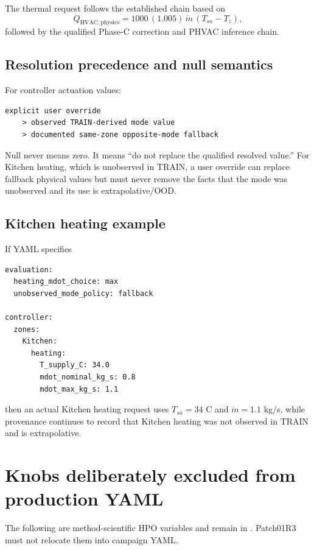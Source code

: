 \documentclass[10pt]{article}
\begin{document}
The thermal request follows the established chain based on
\[
Q_{\mathrm{HVAC,physics}}=1000\,(1.005)\,\dot m\,(T_{sa}-T_z),
\]
followed by the qualified Phase-C correction and PHVAC inference chain.

\subsection{Resolution precedence and null semantics}
For controller actuation values:
\begin{verbatim}
explicit user override
    > observed TRAIN-derived mode value
    > documented same-zone opposite-mode fallback
\end{verbatim}

Null never means zero. It means ``do not replace the qualified resolved value.'' For Kitchen heating, which is unobserved in TRAIN, a user override can replace fallback physical values but must never remove the facts that the mode was unobserved and its use is extrapolative/OOD.

\subsection{Kitchen heating example}
If YAML specifies
\begin{Verbatim}[fontsize=\small]
evaluation:
  heating_mdot_choice: max
  unobserved_mode_policy: fallback

controller:
  zones:
    Kitchen:
      heating:
        T_supply_C: 34.0
        mdot_nominal_kg_s: 0.8
        mdot_max_kg_s: 1.1
\end{Verbatim}
then an actual Kitchen heating request uses $T_{sa}=34$ C and $\dot m=1.1$ kg/s, while provenance continues to record that Kitchen heating was not observed in TRAIN and is extrapolative.

\section{Knobs deliberately excluded from production YAML}
The following are method-scientific HPO variables and remain in . Patch01R3 must not relocate them into campaign YAML.
\end{document}
